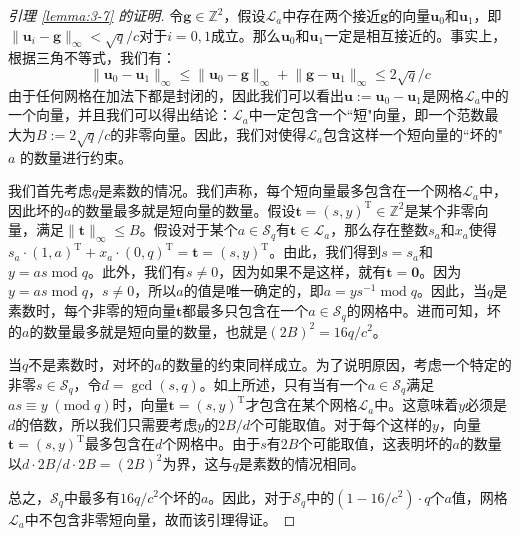 \begin{proof}[引理 \ref{lemma:3-7} 的证明]
令$\boldsymbol{g}\in\mathbb{Z}^2$，假设$\mathcal{L}_a$中存在两个接近$\boldsymbol{g}$的向量$\boldsymbol{u}_0$和$\boldsymbol{u}_1$，即$\lVert\boldsymbol{u}_i-\boldsymbol{g}\rVert_\infty<\sqrt{q}/c$对于$i=0,1$成立。那么$\boldsymbol{u}_0$和$\boldsymbol{u}_1$一定是相互接近的。事实上，根据三角不等式，我们有：
\[
\lVert\boldsymbol{u}_0-\boldsymbol{u}_1\rVert_\infty\leq\lVert\boldsymbol{u}_0-\boldsymbol{g}\rVert_\infty+\lVert\boldsymbol{g}-\boldsymbol{u}_1\rVert_\infty\leq2\sqrt{q}/c
\]
由于任何网格在加法下都是封闭的，因此我们可以看出$\boldsymbol{u}:=\boldsymbol{u}_0-\boldsymbol{u}_1$是网格$\mathcal{L}_a$中的一个向量，并且我们可以得出结论：$\mathcal{L}_a$中一定包含一个``短"向量，即一个范数最大为$B:= 2\sqrt{q}/c$的非零向量。因此，我们对使得$\mathcal{L}_a$包含这样一个短向量的``坏的" $a$ 的数量进行约束。

我们首先考虑$q$是素数的情况。我们声称，每个短向量最多包含在一个网格$\mathcal{L}_a$中，因此坏的$a$的数量最多就是短向量的数量。假设$\boldsymbol{t}=(s,y)^\mathrm{T}\in\mathbb{Z}^2$是某个非零向量，满足$\lVert\boldsymbol{t}\rVert_\infty\leq B$。假设对于某个$a\in\mathcal{S}_q$有$\boldsymbol{t}\in\mathcal{L}_a$，那么存在整数$s_a$和$x_a$使得$s_a\cdot(1,a)^\mathrm{T}+x_a\cdot(0,q)^\mathrm{T}=\boldsymbol{t}=(s,y)^\mathrm{T}$。由此，我们得到$s=s_a$和$y=as\;\mathrm{mod}\;q$。此外，我们有$s\neq0$，因为如果不是这样，就有$\boldsymbol{t}=\boldsymbol{0}$。因为$y=as\;\mathrm{mod}\;q$，$s\neq0$，所以$a$的值是唯一确定的，即$a=ys^{-1}\;\mathrm{mod}\;q$。因此，当$q$是素数时，每个非零的短向量$\boldsymbol{t}$都最多只包含在一个$a\in\mathcal{S}_q$的网格中。进而可知，坏的$a$的数量最多就是短向量的数量，也就是$(2B)^2=16q/c^2$。

当$q$不是素数时，对坏的$a$的数量的约束同样成立。为了说明原因，考虑一个特定的非零$s\in\mathcal{S}_q$，令$d=\gcd(s, q)$。如上所述，只有当有一个$a\in\mathcal{S}_q$满足$as\equiv y\;(\mathrm{mod}\;q)$时，向量$\boldsymbol{t}=(s,y)^\mathrm{T}$才包含在某个网格$\mathcal{L}_a$中。这意味着$y$必须是$d$的倍数，所以我们只需要考虑$y$的$2B/d$个可能取值。对于每个这样的$y$，向量$\boldsymbol{t}=(s,y)^\mathrm{T}$最多包含在$d$个网格中。由于$s$有$2B$个可能取值，这表明坏的$a$的数量以$d\cdot 2B/d \cdot 2B=(2B)^2$为界，这与$q$是素数的情况相同。

总之，$\mathcal{S}_q$中最多有$16q/c^2$个坏的$a$。因此，对于$\mathcal{S}_q$中的$(1-16/c^2)\cdot q$个$a$值，网格$\mathcal{L}_a$中不包含非零短向量，故而该引理得证。
\end{proof}

